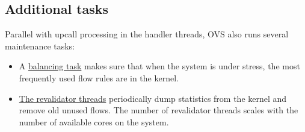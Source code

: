 \subsection{Additional  tasks}
\label{subsec:ovs-tasks}

Parallel with upcall processing in the handler threads, OVS also runs several maintenance tasks:
\begin{itemize}
    \item A \href{https://github.com/openvswitch/ovs/blob/e90a0727f17f6ad915a32735a8c0b282f2c8cd6f/ofproto/ofproto-dpif-upcall.c\#L3312-L3336}{balancing task} makes sure that when the system is under stress, the most frequently used flow rules are in the kernel.
    \item \href{https://github.com/openvswitch/ovs/blob/e90a0727f17f6ad915a32735a8c0b282f2c8cd6f/ofproto/ofproto-dpif-upcall.c\#L83-L111}{The revalidator threads} periodically dump statistics from the kernel and remove old unused flows. The number of revalidator threads scales with the number of available cores on the system.
\end{itemize}

%
% 
% 
% 
